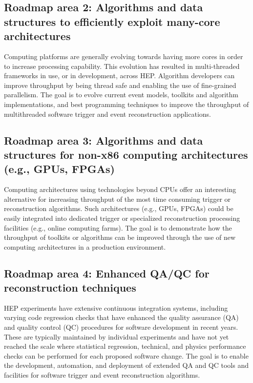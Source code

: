 \subsection{Roadmap area 2: Algorithms and data structures to efficiently exploit many-core architectures}
  
Computing platforms are generally evolving towards having more cores in order to increase processing capability. This evolution has resulted in multi-threaded frameworks in use, or in development, across HEP. Algorithm developers can improve throughput by being thread safe and enabling the use of fine-grained parallelism. The goal is to evolve current event models, toolkits and algorithm implementations, and best programming techniques to improve the throughput of multithreaded software trigger and event reconstruction applications.

\subsection{Roadmap area 3: Algorithms and data structures for non-x86 computing architectures (e.g., GPUs, FPGAs)}

Computing architectures using technologies beyond CPUs offer an interesting alternative for increasing throughput of the most time consuming trigger or reconstruction algorithms. Such architectures (e.g., GPUs, FPGAs) could be easily integrated into dedicated trigger or specialized reconstruction processing facilities (e.g., online computing farms). The goal is to demonstrate how the throughput of toolkits or algorithms can be improved through the use of new computing architectures in a production environment. 

\subsection{Roadmap area 4: Enhanced QA/QC for reconstruction techniques}

HEP experiments have extensive continuous integration systems, including varying code regression checks that have enhanced the quality assurance (QA) and quality control (QC) procedures for software development in recent years. These are typically maintained by individual experiments and have not yet reached the scale where statistical regression, technical, and physics performance checks can be performed for each proposed software change. The goal is to enable the development, automation, and deployment of extended QA and QC tools and facilities for software trigger and event reconstruction algorithms. 

